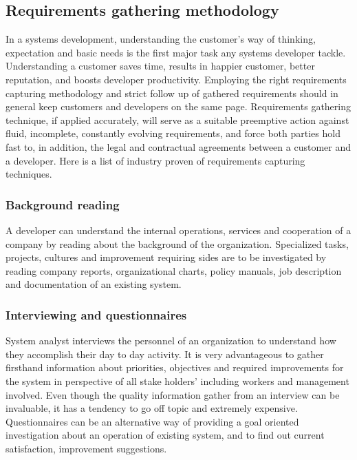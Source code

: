 \subsection{Requirements gathering methodology}

In a systems development, understanding the customer's way of thinking,
expectation and basic needs is the first major task any systems developer
tackle. Understanding a customer saves time, results in happier customer,
better reputation, and boosts developer productivity. Employing the right
requirements capturing methodology and strict follow up of gathered
requirements should in general keep customers and developers on the same page.
Requirements gathering technique, if applied accurately, will serve as a
suitable preemptive action against fluid, incomplete, constantly evolving
requirements, and force both parties hold fast to, in addition, the legal and
contractual agreements between a customer and a developer. Here is a list of
industry proven of requirements capturing techniques.

\subsubsection{Background reading}

A developer can understand the internal operations, services and cooperation of
a company by reading about the background of the organization. Specialized
tasks, projects, cultures and improvement requiring sides are to be
investigated by reading company reports, organizational charts, policy manuals,
job description and documentation of an existing system.

\subsubsection{Interviewing and questionnaires}

System analyst interviews the personnel of an organization to understand how
they accomplish their day to day activity. It is very advantageous to gather
firsthand information about priorities, objectives and required improvements
for the system in perspective of all stake holders' including workers and
management involved. Even though the quality information gather from an
interview can be invaluable, it has a tendency to go off topic and
extremely expensive. Questionnaires can be an alternative way of providing
a goal oriented investigation about an operation of existing system, and to
find out current satisfaction, improvement suggestions.


